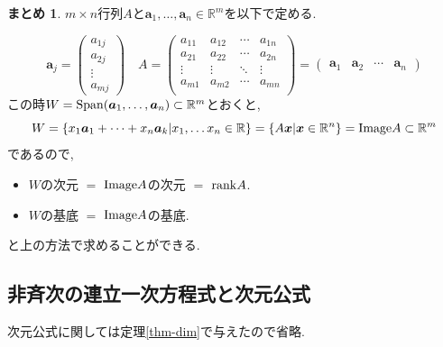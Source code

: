 \documentclass[dvipdfmx,a4paper,11pt]{article}
\newcommand{\R}{\mathbb{R}}
\theoremstyle{definition}
\newtheorem{suma}[thm]{まとめ}
\begin{document}
\begin{tcolorbox}[
    colback = white,
    colframe = green!35!black,
    fonttitle = \bfseries,
    breakable = true]
        \begin{suma}
    $m \times n$行列$A$と$\bm{a}_1, \ldots, \bm{a}_n \in  \R^m$を以下で定める.
    
    $$
    \bm{a}_j=
    \begin{pmatrix}
    a_{1j}\\a_{2j}\\\vdots\\a_{mj}
    \end{pmatrix}
    \quad
     A=\begin{pmatrix}
a_{11}& a_{12} & \cdots &a_{1n} \\
a_{21}& a_{22} & \cdots &a_{2n} \\
\vdots& \vdots	&	\ddots   &	\vdots \\
a_{m1}& a_{m2} & \cdots &a_{mn} \\
\end{pmatrix}
=
    \begin{pmatrix}
    \bm{a}_1&\bm{a}_2&\cdots&\bm{a}_n
    \end{pmatrix}
$$
この時$ W = {\rm Span}(\bm{a}_1, \ldots, \bm{a}_n) \subset \R^m$とおくと, 
$$
 W  =\{ x_1\bm{a}_1 + \cdots +x_n\bm{a}_k | x_1, \ldots x_n \in\R \}
    =\{A \bm{x} | \bm{x} \in \R^n \}
    ={\rm Image}A \subset \R^m
$$
であるので, 
\begin{itemize}
   \setlength{\parskip}{0cm} 
  \setlength{\itemsep}{0cm}
  \item $W$の次元 $=$ ${\rm Image}A$の次元 $=$ ${\rm rank}A$.
  \item $W$の基底 $=$ ${\rm Image}A$の基底.
  \end{itemize}
と上の方法で求めることができる.
\end{suma}
 \end{tcolorbox}
 



\subsection{非斉次の連立一次方程式と次元公式 \cite[2.8節]{M}}
\label{subsec-2.8}
次元公式に関しては定理\ref{thm-dim}で与えたので省略.
\end{document}
